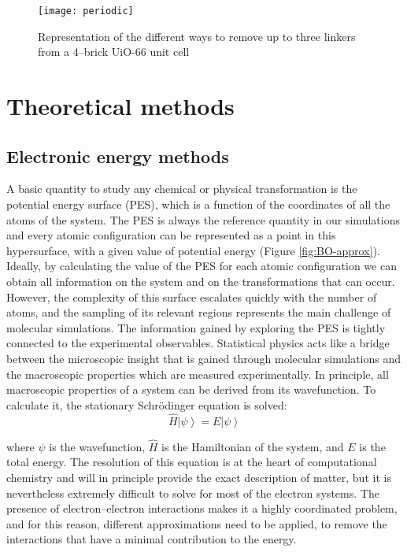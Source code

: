 \begin{figure}[!htbp]
	\centering
 	\texttt{[image: periodic]}
	\caption{Representation of the different ways to remove up to three linkers from a 4--brick UiO-66 unit cell}
	\label{fig:periodic}
\end{figure}

\section{Theoretical methods}
\subsection*{Electronic energy methods}
A basic quantity to study any chemical or physical transformation is the potential energy surface (PES), which is a function of the coordinates of all the atoms of the system. The PES is always the reference quantity in our simulations and every atomic configuration can be represented as a point in this hypersurface, with a given value of potential energy (Figure \ref{fig:BO-approx}).
\npar
Ideally, by calculating the value of the PES for each atomic configuration we can obtain all information on the system and on the transformations that can occur. However, the complexity of this surface escalates quickly with the number of atoms, and the sampling of its relevant regions represents the main challenge of molecular simulations. The information gained by exploring the PES is tightly connected to the experimental observables. Statistical physics acts like a bridge between the microscopic insight that is gained through molecular simulations and the macroscopic properties which are measured experimentally. In principle, all macroscopic properties of a system can be derived from its wavefunction. To calculate it, the stationary Schr\"{o}dinger equation is solved: 
\[
\hat{H}\left\vert\psi\right\rangle = E\left\vert\psi\right\rangle
\]

where $\psi$ is the wavefunction, $\hat{H}$ is the Hamiltonian of the system, and $E$ is the total energy. The resolution of this equation is at the heart of computational chemistry and will in principle provide the exact description of matter, but it is nevertheless extremely difficult to solve for most of the electron systems. The presence of electron--electron interactions makes it a highly coordinated problem, and for this reason, different approximations need to be applied, to remove the interactions that have a minimal contribution to the energy.

